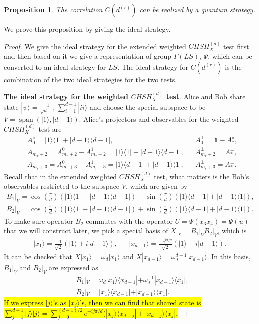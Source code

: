 \documentclass[11pt,letterpaper]{article}
\newcommand{\ket}[1]{|#1\rangle}
\newcommand{\ketbra}[2]{|#1\rangle\langle#2|}
\DeclareMathOperator{\spn}{span}
\newcommand{\1}{\mathbb{1}}
\newcommand{\CHSH}{CHSH^{(d)}}
\newcommand{\LS}{LS}
\newcommand{\dr}[1]{d^{(#1)}}
\newtheorem{proposition}[theorem]{Proposition}
\theoremstyle{definition}
\begin{document}
\begin{proposition}
	\label{prop:realize}
	The correlation $C(\dr{r})$ can be realized by a quantum strategy.
\end{proposition}
We prove this proposition by giving the ideal strategy.
\begin{proof}
We give the ideal strategy for the extended weighted $\CHSH_X$ test first and then based on it we give a representation of 
group $\Gamma(\LS)$, $\Psi$, which can be converted to an ideal strategy for $\LS$. 
The ideal strategy for $C(\dr{r})$ is the combination of the two ideal strategies for the two tests.

\textbf{The ideal strategy for the weighted $\CHSH_X$ test}.
Alice and Bob share state $\ket{\psi} = \frac{1}{\sqrt{d-1}}\sum_{i=1}^{d-1} \ket{ii}$ and choose the special subspace to be 
$V = \spn(\ket{1} ,\ket{d-1})$.
Alice's projectors and observables for the weighted $\CHSH_X$ test are
\begin{align*}
	&A_0^\diamond = \ketbra{1}{1} + \ketbra{d-1}{d-1}, &&A_0^\perp = \1 - A_\ast^\diamond, \\
	&A_{m_r+2} = A_{m_r+2}^0-A_{m_r+2}^1 = \ketbra{1}{1} - \ketbra{d-1}{d-1}, &&A_{m_r+2}^\perp = A_\ast^\perp,\\
	&A_{m_r+3} = A_{m_r+3}^0-A_{m_r+3}^1 = \ketbra{1}{d-1} + \ketbra{d-1}{1} ,&&A_{m_r+3}^\perp = A_\ast^\perp.
\end{align*}
Recall that in the extended weighted $\CHSH_X$ test, what matters is the 
Bob's observables restricted to the subspace $V$, which are given by
\begin{align*}
	B_1|_V = \cos(\frac{\pi}{d})(\ketbra{1}{1} - \ketbra{d-1}{d-1}) - \sin(\frac{\pi}{d})(\ketbra{1}{d-1} + \ketbra{d-1}{1}),\\
	B_2|_V = \cos(\frac{\pi}{d})(\ketbra{1}{1} - \ketbra{d-1}{d-1}) +\sin(\frac{\pi}{d})(\ketbra{1}{d-1} + \ketbra{d-1}{1}).
\end{align*}
To make sure operator $B_2$ commutes with the operator $U = \Psi(x_3x_4) = \Psi(u)$ that we will construct later, we pick a 
special basis of $X|_V =B_1|_VB_2|_V$, which is
\begin{align}
	\ket{x_1} = \frac{-1}{\sqrt{2}}(\ket{1} + i\ket{d-1}), &&
	\ket{x_{d-1}} = \frac{-e^{i\pi/d}}{\sqrt{2}}(\ket{1} - i\ket{d-1}).
\end{align}
It can be checked that $X\ket{x_1} = \omega_d \ket{x_1}$ and $X\ket{x_{d-1}} = \omega_d^{d-1} \ket{x_{d-1}}$.
In this basis, $B_1|_V$ and $B_2|_V$ are expressed as 
\begin{align}
	&B_1|_V = \omega_d\ketbra{x_1}{x_{d-1}} + \omega_d^{-1} \ketbra{x_{d-1}}{x_1},\\
	&B_2|_V =\ketbra{x_1}{x_{d-1}}  + \ketbra{x_{d-1}}{x_1}.
\end{align}
\hl{If we express $\ket{j}$'s as $\ket{x_j}$'s, then we can find that 
shared state is $\sum_{j=1}^{d-1} \ket{j}\ket{j} = \sum_{j=0}^{(d-1)/2} e^{-ij\pi/d} (\ketbra{x_{j}}{x_{d-j}} + \ketbra{x_{d-j}}{x_{j}}$.}


\end{proof}
\end{document}
